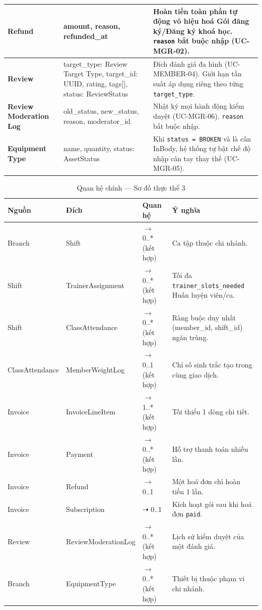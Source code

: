 \begin{longtable}{|>{\centering\arraybackslash}m{3.2cm}|>{\ttfamily\raggedright\arraybackslash}m{3.5cm}|>{\raggedright\arraybackslash}m{7.5cm}|}
\textbf{Refund} &
  amount, reason, refunded\_at &
  Hoàn tiền toàn phần tự động vô hiệu hoá Gói đăng ký/Đăng ký khoá học.
  \texttt{reason} bắt buộc nhập (UC-MGR-02). \\ \hline

\textbf{Review} &
  target\_type: Review Target Type, target\_id: UUID,
  rating, tags[], status: ReviewStatus &
  Đích đánh giá đa hình (UC-MEMBER-04). Giới hạn tần suất
  áp dụng riêng theo từng \texttt{target\_type}. \\ \hline

\textbf{Review Moderation Log} &
  old\_status, new\_status, reason, moderator\_id &
  Nhật ký mọi hành động kiểm duyệt (UC-MGR-06).
  \texttt{reason} bắt buộc nhập. \\ \hline

\textbf{Equipment Type} &
  name, quantity, status: AssetStatus &
  Khi \texttt{status = BROKEN} và là cân InBody,
  hệ thống tự bật chế độ nhập cân tay thay thế (UC-MGR-05). \\ \hline

\end{longtable}
\endgroup

\begin{table}[h]
\centering
\renewcommand{\arraystretch}{1.3}
\begin{tabular}{|>{\centering\arraybackslash}m{3.5cm}|>{\centering\arraybackslash}m{3.5cm}|>{\centering\arraybackslash}m{2cm}|>{\raggedright\arraybackslash}m{5cm}|}
\hline
\textbf{Nguồn} & \textbf{Đích} & \textbf{Quan hệ} & \textbf{Ý nghĩa} \\ \hline
Branch & Shift & 1 $\to$ 0..* (kết hợp) & Ca tập thuộc chi nhánh. \\ \hline
Shift & TrainerAssignment & 1 $\to$ 0..* (kết hợp) & Tối đa \texttt{trainer\_slots\_needed} Huấn luyện viên/ca. \\ \hline
Shift & ClassAttendance & 1 $\to$ 0..* (kết hợp) & Ràng buộc duy nhất (member\_id, shift\_id) ngăn trùng. \\ \hline
ClassAttendance & MemberWeightLog & 1 $\to$ 0..1 (kết hợp) & Chỉ số sinh trắc tạo trong cùng giao dịch. \\ \hline
Invoice & InvoiceLineItem & 1 $\to$ 1..* (kết hợp) & Tối thiểu 1 dòng chi tiết. \\ \hline
Invoice & Payment & 1 $\to$ 0..* (kết hợp) & Hỗ trợ thanh toán nhiều lần. \\ \hline
Invoice & Refund & 1 $\to$ 0..1 & Một hoá đơn chỉ hoàn tiền 1 lần. \\ \hline
Invoice & Subscription & $\dashrightarrow$ 0..1 & Kích hoạt gói sau khi hoá đơn \texttt{paid}. \\ \hline
Review & ReviewModerationLog & 1 $\to$ 0..* (kết hợp) & Lịch sử kiểm duyệt của một đánh giá. \\ \hline
Branch & EquipmentType & 1 $\to$ 0..* (kết hợp) & Thiết bị thuộc phạm vi chi nhánh. \\ \hline
\end{tabular}
\caption{Quan hệ chính — Sơ đồ thực thể 3}
\end{table}

